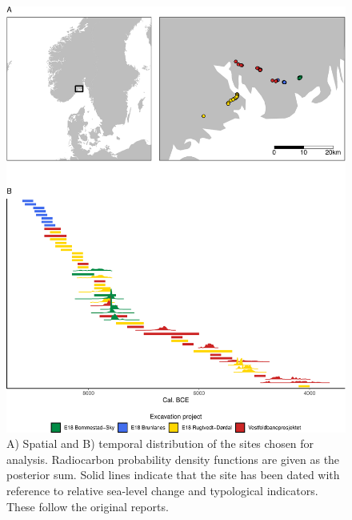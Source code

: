 \documentclass[
]{article}
\begin{document}
\begin{figure}
\centering
\includegraphics{../figures/dist-1.pdf}
\caption{\label{fig:dist}A) Spatial and B) temporal distribution of the sites chosen for analysis. Radiocarbon probability density functions are given as the posterior sum. Solid lines indicate that the site has been dated with reference to relative sea-level change and typological indicators. These follow the original reports.}
\end{figure}
\end{document}
